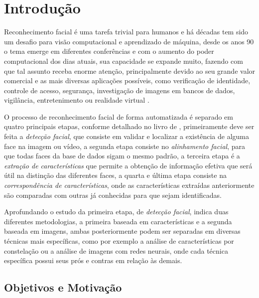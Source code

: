 
\chapter[Introdução]{Introdução}

Reconhecimento facial é uma tarefa trivial para humanos e há décadas tem sido um desafio para visão computacional e aprendizado de máquina, desde os anos 90 o tema emerge em diferentes conferências e com o aumento do poder computacional dos dias atuais, sua capacidade se expande muito, fazendo com que tal assunto receba enorme atenção, principalmente devido ao seu grande valor comercial e as mais diversas aplicações possíveis, como verificação de identidade, controle de acesso, segurança, investigação de imagens em bancos de dados, vigilância, entretenimento ou realidade virtual \cite{appli2014} \cite{Zhao:2003:FRL:954339.954342}.

O processo de reconhecimento facial de forma automatizada é separado em quatro principais etapas, conforme detalhado no livro de  , primeiramente deve ser feita a \textit{detecção facial}, que consiste em validar e localizar a existência de alguma face na imagem ou vídeo, a segunda etapa consiste no \textit{alinhamento facial}, para que todas faces da base de dados sigam o mesmo padrão, a terceira etapa é a \textit{extração de características} que permite a obtenção de informação efetiva que será útil na distinção das diferentes faces, a quarta e última etapa consiste na \textit{correspondência de características}, onde as características extraídas anteriormente são comparadas com outras já conhecidas para que sejam identificadas.

Aprofundando o estudo da primeira etapa, de \textit{detecção facial},   indica duas diferentes metodologias, a primeira baseada em características e a segunda baseada em imagens, ambas posteriormente podem ser separadas em diversas técnicas mais específicas, como por exemplo a análise de características por constelação ou a análise de imagens com redes neurais, onde cada técnica específica possui seus prós e contras em relação às demais.

\section{Objetivos e Motivação}

